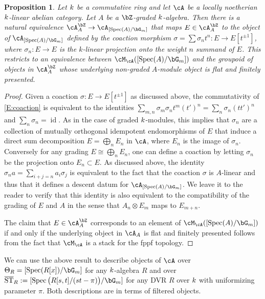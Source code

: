 \documentclass[a4paper]{amsart}
\numberwithin{equation}{section}
\theoremstyle{plain}
\newtheorem{prop}[thm]{Proposition}
\theoremstyle{definition}
\DeclareMathOperator{\Spec}{Spec}
\DeclareMathOperator{\ST}{ST}
\DeclareMathOperator{\id}{id}
\def\oST{\overline{\ST}}
\begin{document}
\begin{prop} \label{P:abelian_graded_alg}
Let ${k}$ be a commutative ring and let $\cA$ be a locally noetherian ${k}$-linear abelian category.  Let $A$ be a $\bZ$-graded ${k}$-algebra. Then there is a natural equivalence $\cA^\bZ_A \to \cA_{[\Spec(A)/\bG_m]}$ that maps $E \in \cA_A^\bZ$ to the object of $\cA_{[\Spec(A)/\bG_m]}$ defined by the coaction morphism $\sigma = \sum \sigma_n t^n :  E \to E[t^{\pm1}]$, where $\sigma_n : E \to E$ is the $k$-linear projection onto the weight $n$ summand of $E$. This restricts to an equivalence between $\cM_{\cA}([\Spec(A)/\bG_m])$ and the groupoid of objects in $\cA_A^{\bZ}$ whose underlying non-graded $A$-module object is flat and finitely presented.
\end{prop}
\begin{proof}
Given a coaction $\sigma : E \to E[t^{\pm1}]$ as discussed above, the commutativity of \eqref{E:coaction} is equivalent to the identities $\sum_{m,n} \sigma_m \sigma_n t^m (t')^n = \sum_n \sigma_n (tt')^n$ and $\sum_n \sigma_n = \id$. As in the case of graded $k$-modules, this implies that $\sigma_n$ are a collection of mutually orthogonal idempotent endomorphisms of $E$ that induce a direct sum decomposition $E = \bigoplus_n E_n$ in $\cA$, where $E_n$ is the image of $\sigma_n$. Conversely for any grading $E \cong \bigoplus_n E_n$, one can define a coaction by letting $\sigma_n$ be the projection onto $E_n \subset E$. As discussed above, the identity $\sigma_n a = \sum_{i+j=n} a_i \sigma_j$ is equivalent to the fact that the coaction $\sigma$ is $A$-linear and thus that it defines a descent datum for $\cA_{[\Spec(A)/\bG_m]}$. We leave it to the reader to verify that this identity is also equivalent to the compatibility of the grading of $E$ and $A$ in the sense that $A_n \otimes E_m$ maps to $E_{m+n}$.

The claim that $E \in \cA_A^\bZ$ corresponds to an element of $\cM_\cA([\Spec(A)/\bG_m])$ if and only if the underlying object in $\cA_A$ is flat and finitely presented follows from the fact that $\cM_\cA$ is a stack for the fppf topology.
\end{proof}

We can use the above result to describe objects of $\cA$ over $\Theta_R = [\Spec(R[x])/\bG_m]$ for any $k$-algebra $R$ and over $\oST_R := [\Spec \big(R[s,t] / (st-\pi)\big)  / \bG_m]$ for any DVR $R$ over $k$ with uniformizing parameter $\pi$.  Both descriptions are in terms of filtered objects.
\end{document}
